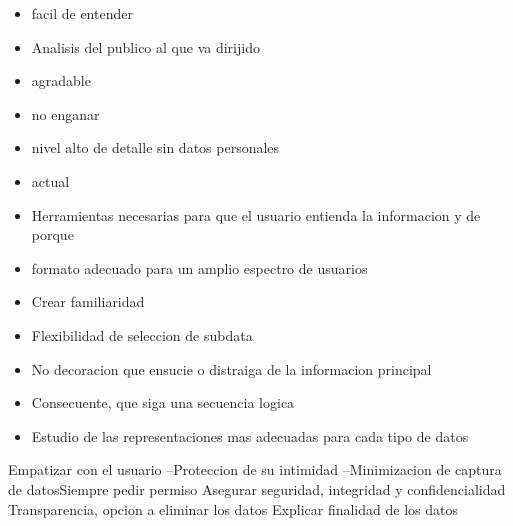 \begin{itemize}
\item facil de entender
\item Analisis del publico al que va dirijido
\item agradable
\item no enganar
\item nivel alto de detalle sin datos personales
\item actual
\item Herramientas necesarias para que el usuario entienda la informacion y de porque
\item formato adecuado para un amplio espectro de usuarios
\item Crear familiaridad
\item Flexibilidad de seleccion de subdata
\item No decoracion que ensucie o distraiga de la informacion principal
\item Consecuente, que siga una secuencia logica
\item Estudio de las representaciones mas adecuadas para cada tipo de datos
  \end{itemize}

  Empatizar con el usuario
  --Proteccion de su intimidad
  --Minimizacion de captura de datosSiempre pedir permiso
  Asegurar seguridad, integridad y confidencialidad
  Transparencia, opcion a eliminar los datos
  Explicar finalidad de los datos\\

  